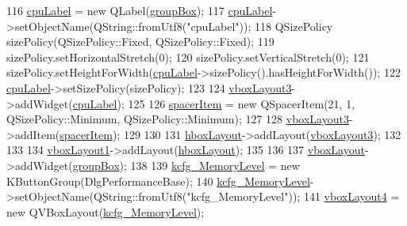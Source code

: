 \begin{DoxyCode}
116         \hyperlink{classUi__DlgPerformanceBase_add0831b3efdd1175e047cbffe44f0f8d}{cpuLabel} = \textcolor{keyword}{new} QLabel(\hyperlink{classUi__DlgPerformanceBase_a95446d4eb7ed6bca1d9ab130459e2026}{groupBox});
117         \hyperlink{classUi__DlgPerformanceBase_add0831b3efdd1175e047cbffe44f0f8d}{cpuLabel}->setObjectName(QString::fromUtf8(\textcolor{stringliteral}{"cpuLabel"}));
118         QSizePolicy sizePolicy(QSizePolicy::Fixed, QSizePolicy::Fixed);
119         sizePolicy.setHorizontalStretch(0);
120         sizePolicy.setVerticalStretch(0);
121         sizePolicy.setHeightForWidth(\hyperlink{classUi__DlgPerformanceBase_add0831b3efdd1175e047cbffe44f0f8d}{cpuLabel}->sizePolicy().hasHeightForWidth());
122         \hyperlink{classUi__DlgPerformanceBase_add0831b3efdd1175e047cbffe44f0f8d}{cpuLabel}->setSizePolicy(sizePolicy);
123 
124         \hyperlink{classUi__DlgPerformanceBase_a353ef6aa2acdcffede6a00356a036484}{vboxLayout3}->addWidget(\hyperlink{classUi__DlgPerformanceBase_add0831b3efdd1175e047cbffe44f0f8d}{cpuLabel});
125 
126         \hyperlink{classUi__DlgPerformanceBase_acea1ae89922e962a9197eb648f0459ae}{spacerItem} = \textcolor{keyword}{new} QSpacerItem(21, 1, QSizePolicy::Minimum, QSizePolicy::Minimum);
127 
128         \hyperlink{classUi__DlgPerformanceBase_a353ef6aa2acdcffede6a00356a036484}{vboxLayout3}->addItem(\hyperlink{classUi__DlgPerformanceBase_acea1ae89922e962a9197eb648f0459ae}{spacerItem});
129 
130 
131         \hyperlink{classUi__DlgPerformanceBase_af14f550725818437cba053b3da16ef8a}{hboxLayout}->addLayout(\hyperlink{classUi__DlgPerformanceBase_a353ef6aa2acdcffede6a00356a036484}{vboxLayout3});
132 
133 
134         \hyperlink{classUi__DlgPerformanceBase_a39bb4caf4acbc4131727a12ec7bff223}{vboxLayout1}->addLayout(\hyperlink{classUi__DlgPerformanceBase_af14f550725818437cba053b3da16ef8a}{hboxLayout});
135 
136 
137         \hyperlink{classUi__DlgPerformanceBase_abae379ebe3e2f77707d6621ce00a7236}{vboxLayout}->addWidget(\hyperlink{classUi__DlgPerformanceBase_a95446d4eb7ed6bca1d9ab130459e2026}{groupBox});
138 
139         \hyperlink{classUi__DlgPerformanceBase_a93edac845d7c5b17eb8daf50d97d0e3f}{kcfg\_MemoryLevel} = \textcolor{keyword}{new} KButtonGroup(DlgPerformanceBase);
140         \hyperlink{classUi__DlgPerformanceBase_a93edac845d7c5b17eb8daf50d97d0e3f}{kcfg\_MemoryLevel}->setObjectName(QString::fromUtf8(\textcolor{stringliteral}{"kcfg\_MemoryLevel"}));
141         \hyperlink{classUi__DlgPerformanceBase_a8cc54ee3f49d72f579529a8c662a83d7}{vboxLayout4} = \textcolor{keyword}{new} QVBoxLayout(\hyperlink{classUi__DlgPerformanceBase_a93edac845d7c5b17eb8daf50d97d0e3f}{kcfg\_MemoryLevel});

\end{DoxyCode}
